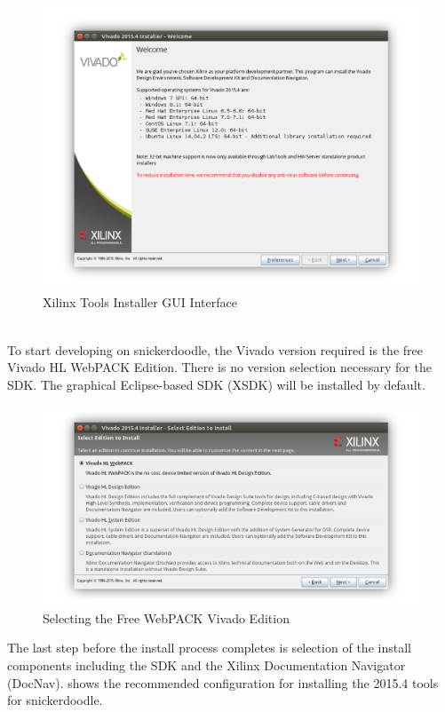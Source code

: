 \begin{figure}
	\centering
	\includegraphics{images/Vivado_Installer_Welcome.png}
	\caption{Xilinx Tools Installer GUI Interface}
\end{figure}


~\\
\noindent
To start developing on snickerdoodle, the Vivado version required is the free Vivado HL WebPACK Edition. There is no version selection necessary for the SDK. The graphical Eclipse-based SDK (XSDK) will be installed by default. \\

\begin{figure}
	\centering
	\includegraphics{images/Vivado_Installer_Edition.png}
	\caption{Selecting the Free WebPACK Vivado Edition}
\end{figure}


\noindent
The last step before the install process completes is selection of the install components including the SDK and the Xilinx Documentation Navigator (DocNav).  shows the recommended configuration for installing the 2015.4 tools for snickerdoodle. \\

